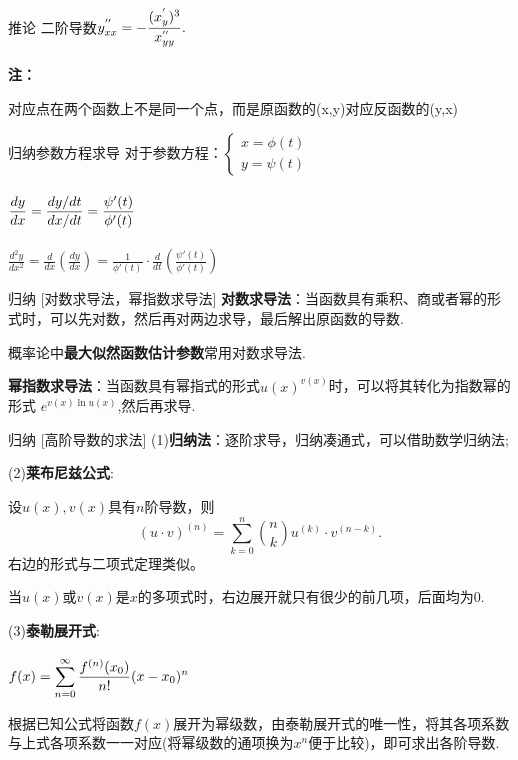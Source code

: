 \documentclass[a4paper,12pt,oneside,fontset=none]{ctexbook}
\let\olddfrac\dfrac
\renewcommand{\dfrac}[2]{
    \olddfrac{#1\vrule width 0pt height 1.15em depth 0em}{#2\vrule width 0pt height 0em depth 0.6em}
}
\let\oldsum\sum
\renewcommand{\sum}{\displaystyle\oldsum}
\newenvironment{corollary}[1][]{\begin{thmBox}{推论}{#1}}{\end{thmBox}}
\newenvironment{induction}[1][]{\begin{thmBox}{归纳}{#1}}{\end{thmBox}}
\newenvironment{note}{
    \par\vspace{0.5em}\noindent
    \textbf{\color{NoteColor} 注：}
}{
    \par\vspace{0.5em}
}
\numberwithin{equation}{chapter}
\begin{document}
\begin{corollary}
二阶导数$y_{xx}^{''} = -\dfrac{(x_{y}^{'})^3}{x_{yy}^{''}}.$
\end{corollary}
\begin{note}
对应点在两个函数上不是同一个点，而是原函数的(x,y)对应反函数的(y,x)
\end{note}


\begin{induction}[参数方程求导]
对于参数方程：$\begin{cases}
x = \phi(t) \\
y = \psi(t)
\end{cases}$

$\dfrac{dy}{dx} = \dfrac{{dy}/{dt}}{{dx}/{dt}} = \dfrac{\psi '(t)}{\phi '(t)}$

$\frac{d^2 y}{d x^2} = \frac{d}{dx}\left(\frac{dy}{dx}\right) = \frac{1}{\phi'(t)} \cdot \frac{d}{dt}\left(\frac{\psi'(t)}{\phi'(t)}\right)$
\end{induction}


\begin{induction}
    [对数求导法，幂指数求导法]
\textbf{对数求导法}：当函数具有乘积、商或者幂的形式时，可以先对数，然后再对两边求导，最后解出原函数的导数.

概率论中\textbf{最大似然函数估计参数}常用对数求导法.

\textbf{幂指数求导法}：当函数具有幂指式的形式$u(x)^{v(x)}$时，可以将其转化为指数幂的形式 $e^{v(x)\ln u(x)}$,然后再求导.
\end{induction}


\begin{induction}
    [高阶导数的求法]
(1)\textbf{归纳法}：逐阶求导，归纳凑通式，可以借助数学归纳法;

(2)\textbf{莱布尼兹公式}:

设$u(x),v(x)$具有$n$阶导数，则
\[(u\cdot v)^{(n)} = \sum_{k=0}^{n} \binom{n}{k} u^{(k)} \cdot v^{(n-k)}.\]
右边的形式与二项式定理类似。

当$u(x)$或$v(x)$是$x$的多项式时，右边展开就只有很少的前几项，后面均为0.

(3)\textbf{泰勒展开式}:

$f(x) = \sum_{n=0}^{\infty}\dfrac{f^{(n)}(x_0)}{n!}(x-x_0)^n$

根据已知公式将函数$f(x)$展开为幂级数，由泰勒展开式的唯一性，将其各项系数与上式各项系数一一对应(将幂级数的通项换为$x^n$便于比较)，即可求出各阶导数.
\end{induction}
\end{document}
